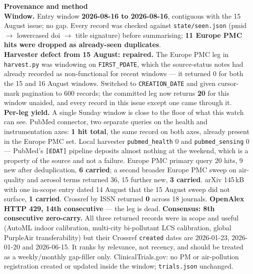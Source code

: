 \documentclass[10pt]{article}
\begin{document}
\vspace{4mm}
\begin{keybox}
{\sffamily\bfseries\footnotesize\color{Deep}Provenance and method}\\[1.2mm]
{\fontsize{7.2}{8.8}\selectfont
\textbf{Window.} Entry window \textbf{2026-08-16 to 2026-08-16}, contiguous with the
15 August issue; no gap. Every record was checked against \texttt{state/seen.json}
(pmid $\rightarrow$ lowercased doi $\rightarrow$ title signature) before summarising;
\textbf{11 Europe PMC hits were dropped as already-seen duplicates}.\\[0.8mm]
\textbf{Harvester defect from 15 August: repaired.} The Europe PMC leg in
\texttt{harvest.py} was windowing on \texttt{FIRST\_PDATE}, which the source-status notes
had already recorded as non-functional for recent windows --- it returned 0 for both the
15 and 16 August windows. Switched to \texttt{CREATION\_DATE} and given cursor-mark
pagination to 600 records; the committed leg now returns \textbf{20} for this window
unaided, and every record in this issue except one came through it.\\[0.8mm]
\textbf{Per-leg yield.} A single Sunday window is close to the floor of what this watch can
see. PubMed connector, two separate queries on the health and instrumentation axes:
\textbf{1 hit total}, the same record on both axes, already present in the Europe PMC set.
Local harvester \texttt{pubmed\_health} 0 and \texttt{pubmed\_sensing} 0 --- PubMed's
\texttt{[EDAT]} pipeline deposits almost nothing at the weekend, which is a property of the
source and not a failure. Europe PMC primary query 20 hits, 9 new after deduplication,
\textbf{6 carried}; a second broader Europe PMC sweep on air-quality and aerosol terms
returned 36, 15 further new, \textbf{3 carried}. arXiv 145\,kB with one in-scope entry
dated 14 August that the 15 August sweep did not surface, \textbf{1 carried}. Crossref by
ISSN returned \textbf{0} across 18 journals. \textbf{OpenAlex HTTP 429, 14th consecutive}
--- the leg is dead. \textbf{Consensus: 8th consecutive zero-carry.} All three returned
records were in scope and useful (AutoML indoor calibration, multi-city bi-pollutant LCS
calibration, global PurpleAir transferability) but their Crossref \texttt{created} dates
are 2026-01-23, 2026-01-20 and 2026-06-15. It ranks by relevance, not recency, and should
be treated as a weekly/monthly gap-filler only. ClinicalTrials.gov: no PM or air-pollution
registration created or updated inside the window; \texttt{trials.json}
unchanged.\\[0.8mm]
}
\end{keybox}
\end{document}
